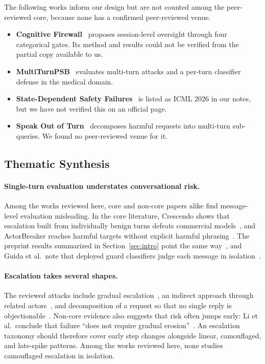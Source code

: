 \documentclass[sigconf]{acmart}
\begin{document}
The following works inform our design but are not counted among the peer-reviewed core, because none has a confirmed peer-reviewed venue.
\begin{itemize}
  \item \textbf{Cognitive Firewall}~\cite{guida2026cognitive} proposes session-level oversight through four categorical gates. Its method and results could not be verified from the partial copy available to us.
  \item \textbf{MultiTurnPSB}~\cite{sheoran2026multiturnpsb} evaluates multi-turn attacks and a per-turn classifier defense in the medical domain.
  \item \textbf{State-Dependent Safety Failures}~\cite{li2026state} is listed as ICML 2026 in our notes, but we have not verified this on an official page.
  \item \textbf{Speak Out of Turn}~\cite{zhou2024speak} decomposes harmful requests into multi-turn sub-queries. We found no peer-reviewed venue for it.
\end{itemize}

\subsection{Thematic Synthesis}
\label{sec:rw-synthesis}

\paragraph{Single-turn evaluation understates conversational risk.}
Among the works reviewed here, core and non-core papers alike find message-level evaluation misleading. In the core literature, Crescendo shows that escalation built from individually benign turns defeats commercial models~\cite{russinovich2025crescendo}, and ActorBreaker reaches harmful targets without explicit harmful phrasing~\cite{ren2025llms}. The preprint results summarized in Section~\ref{sec:intro} point the same way~\cite{sheoran2026multiturnpsb,li2026state}, and Guida et al.\ note that deployed guard classifiers judge each message in isolation~\cite{guida2026cognitive}.

\paragraph{Escalation takes several shapes.}
The reviewed attacks include gradual escalation~\cite{russinovich2025crescendo}, an indirect approach through related actors~\cite{ren2025llms}, and decomposition of a request so that no single reply is objectionable~\cite{zhou2024speak}. Non-core evidence also suggests that risk often jumps early: Li et al.\ conclude that failure ``does not require gradual erosion''~\cite{li2026state}. An escalation taxonomy should therefore cover early step changes alongside linear, camouflaged, and late-spike patterns. Among the works reviewed here, none studies camouflaged escalation in isolation.
\end{document}
